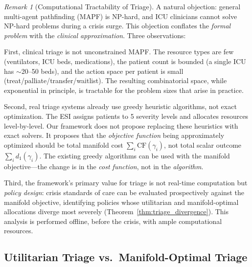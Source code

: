 \documentclass[12pt]{article}
\theoremstyle{definition}
\theoremstyle{remark}
\newtheorem{remark}[theorem]{Remark}
\newcommand{\CF}{\mathrm{CF}}              %
\begin{document}
\begin{remark}[Computational Tractability of Triage]
\label{rem:triage_tractability}
A natural objection: general multi-agent pathfinding (MAPF) is NP-hard, and ICU clinicians cannot solve NP-hard problems during a crisis surge.  This objection conflates the \emph{formal problem} with the \emph{clinical approximation}.  Three observations:

First, clinical triage is not unconstrained MAPF.  The resource types are few (ventilators, ICU beds, medications), the patient count is bounded (a single ICU has $\sim$20--50 beds), and the action space per patient is small (treat/palliate/transfer/waitlist).  The resulting combinatorial space, while exponential in principle, is tractable for the problem sizes that arise in practice.

Second, real triage systems already use greedy heuristic algorithms, not exact optimization.  The ESI \cite{gilboy2011} assigns patients to 5 severity levels and allocates resources level-by-level.  Our framework does not propose replacing these heuristics with exact solvers.  It proposes that the \emph{objective function} being approximately optimized should be total manifold cost $\sum_i \CF(\gamma_i)$, not total scalar outcome $\sum_i d_1(\gamma_i)$.  The existing greedy algorithms can be used with the manifold objective---the change is in the \emph{cost function}, not in the \emph{algorithm}.

Third, the framework's primary value for triage is not real-time computation but \emph{policy design}: crisis standards of care can be evaluated prospectively against the manifold objective, identifying policies whose utilitarian and manifold-optimal allocations diverge most severely (Theorem~\ref{thm:triage_divergence}).  This analysis is performed offline, before the crisis, with ample computational resources.
\end{remark}

\subsection{Utilitarian Triage vs.\ Manifold-Optimal Triage}
\end{document}
